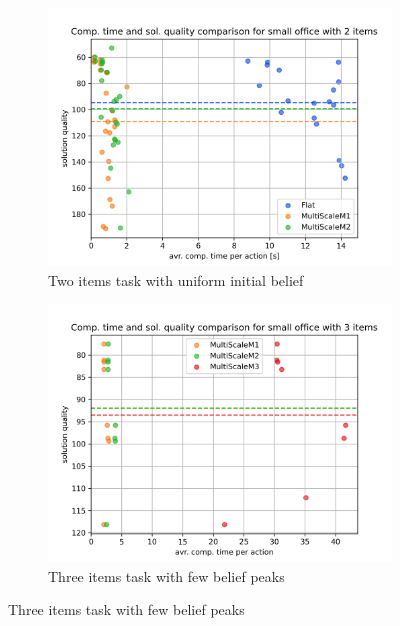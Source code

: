 \begin{figure}
    \hfill
    \begin{subfigure}[b]{0.49\textwidth}
        \includegraphics[width=\textwidth]{Report/images/comp_time_vs_sol_quality/envsmall_sc08_scatter_comptimes_vs_solqual.png}
        \caption{Two items task with uniform initial belief}
        \label{subfig:comp_sc08}
    \end{subfigure}
    \hfill
    \begin{subfigure}[b]{0.49\textwidth}
         \includegraphics[width=\textwidth]{Report/images/comp_time_vs_sol_quality/envsmall_sc09_scatter_comptimes_vs_solqual.png}
        \caption{Three items task with few belief peaks}
        \label{subfig:comp_sc09}
    \end{subfigure}

\end{figure}
